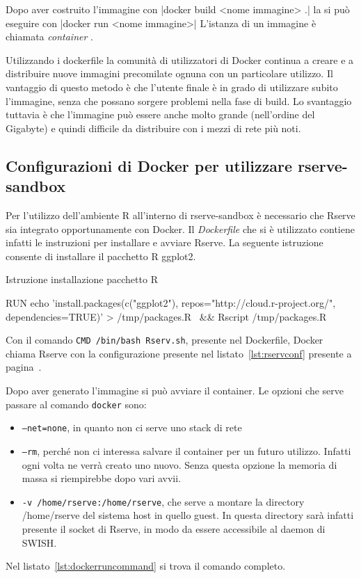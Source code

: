 \documentclass[10pt,titlepage,twoside,a4paper]{report}
\newenvironment{code}{\singlespacing\captionsetup{type=listing}}{}
\begin{document}
Dopo aver costruito l'immagine con |docker build <nome 
immagine> .|
la si può eseguire con |docker run <nome immagine>|
L'istanza di un immagine è chiamata \emph{container} 
\cite{DockerfileReference}.

Utilizzando i dockerfile la comunità di utilizzatori di Docker continua a 
creare e a distribuire nuove immagini precomilate ognuna con un particolare 
utilizzo.
Il vantaggio di questo metodo è che l'utente finale è in grado di utilizzare 
subito l'immagine, senza che possano sorgere problemi nella fase di build. Lo 
svantaggio tuttavia è che l'immagine può  essere anche molto grande 
(nell'ordine del Gigabyte) e quindi difficile da distribuire con i mezzi di 
rete più noti.

    \subsection{Configurazioni di Docker per utilizzare rserve-sandbox}
Per l'utilizzo dell'ambiente R all'interno di rserve-sandbox è necessario che 
Rserve sia integrato opportunamente con Docker. Il \emph{Dockerfile} che si 
è utilizzato contiene infatti le instruzioni per installare e avviare Rserve.
La seguente istruzione consente di installare il pacchetto R ggplot2.

\begin{code}
    \caption{Istruzione installazione pacchetto R}
    \begin{shellcode*}{}
RUN echo 'install.packages(c("ggplot2"), repos="http://cloud.r-project.org/", dependencies=TRUE)' > /tmp/packages.R \
    && Rscript /tmp/packages.R
    \end{shellcode*}
\end{code}

Con il comando \texttt{CMD /bin/bash Rserv.sh}, presente nel 
Dockerfile,
Docker chiama Rserve con la configurazione presente nel 
listato~\ref{lst:rservconf} presente a pagina~\pageref{lst:rservconf}.

Dopo aver generato l'immagine si può avviare il container.
Le opzioni che serve passare al comando \texttt{docker} sono:
\begin{itemize}
    \item  \texttt{--net=none}, in quanto non ci serve uno stack di rete
    \item  \texttt{--rm}, perché non ci interessa salvare il container per
           un futuro utilizzo. Infatti ogni volta ne verrà creato uno nuovo.
           Senza questa opzione la memoria di massa si riempirebbe dopo
           vari avvii.
    \item  \texttt{-v /home/rserve:/home/rserve}, che serve a montare 
           la directory /home/rserve del sistema host in quello guest.
           In questa directory sarà infatti presente il socket di Rserve,
           in modo da essere accessibile al daemon di SWISH.
\end{itemize}
Nel listato~\ref{lst:dockerruncommand} si trova il comando completo.
\end{document}
